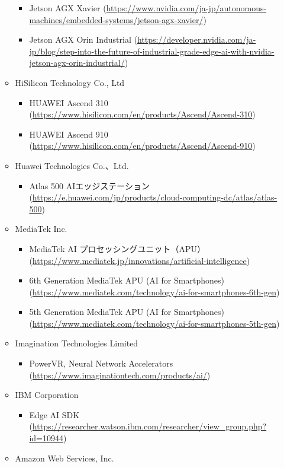 \begin{itemize}
\begin{itemize}
\begin{itemize}
			\item Jetson AGX Xavier (\url{https://www.nvidia.com/ja-jp/autonomous-machines/embedded-systems/jetson-agx-xavier/})
			\item Jetson AGX Orin Industrial (\url{https://developer.nvidia.com/ja-jp/blog/step-into-the-future-of-industrial-grade-edge-ai-with-nvidia-jetson-agx-orin-industrial/})
		\end{itemize}
		\item HiSilicon Technology Co., Ltd
		\begin{itemize}
			\item HUAWEI Ascend 310 (\url{https://www.hisilicon.com/en/products/Ascend/Ascend-310})
			\item HUAWEI Ascend 910 (\url{https://www.hisilicon.com/en/products/Ascend/Ascend-910})
		\end{itemize}
		\item Huawei Technologies Co.、Ltd.
		\begin{itemize}
			\item Atlas 500 AIエッジステーション (\url{https://e.huawei.com/jp/products/cloud-computing-dc/atlas/atlas-500})
		\end{itemize}
		\item MediaTek Inc.
		\begin{itemize}
			\item MediaTek AI プロセッシングユニット（APU） (\url{https://www.mediatek.jp/innovations/artificial-intelligence})
			\item 6th Generation MediaTek APU (AI for Smartphones) (\url{https://www.mediatek.com/technology/ai-for-smartphones-6th-gen})
			\item 5th Generation MediaTek APU (AI for Smartphones) (\url{https://www.mediatek.com/technology/ai-for-smartphones-5th-gen})
		\end{itemize}
		\item Imagination Technologies Limited
		\begin{itemize}
			\item PowerVR, Neural Network Accelerators (\url{https://www.imaginationtech.com/products/ai/})
		\end{itemize}
		\item IBM Corporation
		\begin{itemize}
			\item Edge AI SDK (\url{https://researcher.watson.ibm.com/researcher/view_group.php?id=10944})
		\end{itemize}
		\item Amazon Web Services, Inc.

\end{itemize}
\end{itemize}
